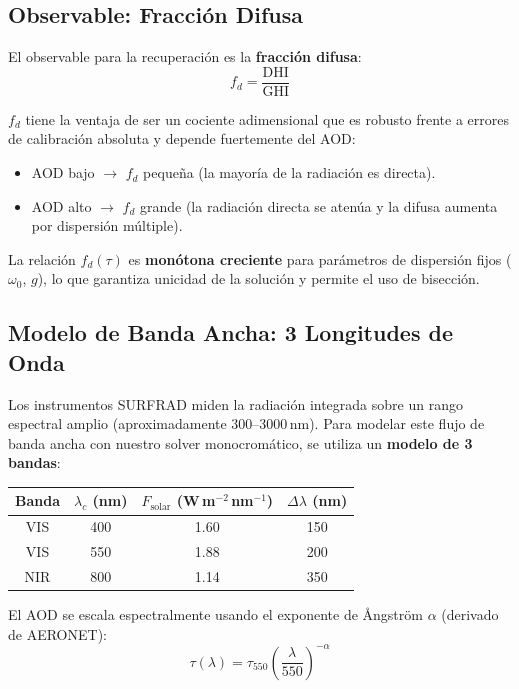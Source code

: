 \documentclass[a4paper,11pt]{article}
\begin{document}
\subsection{Observable: Fracci\'on Difusa}

El observable para la recuperaci\'on es la \textbf{fracci\'on difusa}:
\begin{equation}\label{eq:diff_frac}
    \boxed{f_d = \frac{\text{DHI}}{\text{GHI}}}
\end{equation}

$f_d$ tiene la ventaja de ser un cociente adimensional que es robusto frente a
errores de calibraci\'on absoluta y depende fuertemente del AOD:
\begin{itemize}
    \item AOD bajo $\to$ $f_d$ peque\~na (la mayor\'ia de la radiaci\'on es directa).
    \item AOD alto $\to$ $f_d$ grande (la radiaci\'on directa se aten\'ua y la
          difusa aumenta por dispersi\'on m\'ultiple).
\end{itemize}

La relaci\'on $f_d(\tau)$ es \textbf{mon\'otona creciente} para par\'ametros
de dispersi\'on fijos ($\omega_0$, $g$), lo que garantiza unicidad de la
soluci\'on y permite el uso de bisecci\'on.

\subsection{Modelo de Banda Ancha: 3 Longitudes de Onda}

Los instrumentos SURFRAD miden la radiaci\'on integrada sobre un rango espectral
amplio (aproximadamente 300--3000\,nm).  Para modelar este flujo de banda ancha
con nuestro solver monocrom\'atico, se utiliza un \textbf{modelo de 3 bandas}:

\begin{center}
\begin{tabular}{@{}cccc@{}}
\toprule
\textbf{Banda} & $\lambda_c$ (nm) & $F_{\text{solar}}$ (W\,m$^{-2}$\,nm$^{-1}$)
& $\Delta\lambda$ (nm) \\ \midrule
VIS  & 400 & 1.60 & 150 \\
VIS  & 550 & 1.88 & 200 \\
NIR  & 800 & 1.14 & 350 \\
\bottomrule
\end{tabular}
\end{center}

El AOD se escala espectralmente usando el exponente de \AA ngstr\"om
$\alpha$ (derivado de AERONET):
\begin{equation}\label{eq:angstrom}
    \tau(\lambda) = \tau_{550}\left(\frac{\lambda}{550}\right)^{-\alpha}
\end{equation}
\end{document}
